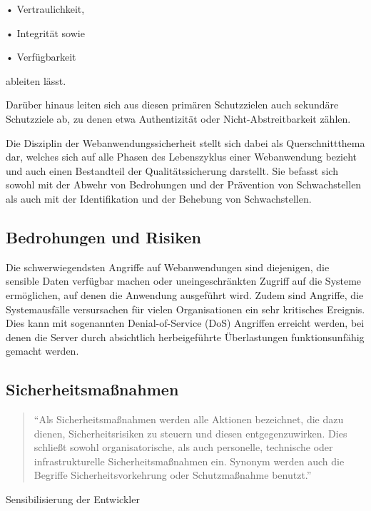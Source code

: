 \documentclass[12pt,oneside,a4paper,parskip]{scrbook}
\begin{document}
  • Vertraulichkeit,

  • Integrität sowie

  • Verfügbarkeit

  ableiten lässt.

  Darüber hinaus leiten sich aus diesen primären Schutzzielen auch sekundäre Schutzziele ab, zu denen etwa
  Authentizität oder Nicht-Abstreitbarkeit zählen.

  Die Disziplin der Webanwendungssicherheit stellt sich dabei als Querschnittthema dar, welches sich auf alle
  Phasen des Lebenszyklus einer Webanwendung bezieht und auch einen Bestandteil der Qualitätssicherung
  darstellt. Sie befasst sich sowohl mit der Abwehr von Bedrohungen und der Prävention von Schwachstellen
  als auch mit der Identifikation und der Behebung von Schwachstellen. \cite{BSI}
  \subsection{Bedrohungen und Risiken}
  Die schwerwiegendsten Angriffe auf Webanwendungen sind diejenigen, die sensible Daten verfügbar machen oder uneingeschränkten Zugriff auf die Systeme ermöglichen, auf denen die Anwendung ausgeführt wird. Zudem sind Angriffe, die Systemausfälle versursachen für vielen Organisationen ein sehr kritisches Ereignis. Dies kann mit sogenannten Denial-of-Service (DoS) Angriffen erreicht werden, bei denen die Server durch absichtlich herbeigeführte Überlastungen funktionsunfähig gemacht werden.


  \subsection{Sicherheitsmaßnahmen}
    \begin{quote} ``Als Sicherheitsmaßnahmen werden alle Aktionen bezeichnet, die dazu dienen, Sicherheitsrisiken zu steuern und diesen entgegenzuwirken. Dies schließt sowohl organisatorische, als auch personelle, technische oder infrastrukturelle Sicherheitsmaßnahmen ein. Synonym werden auch die Begriffe Sicherheitsvorkehrung oder Schutzmaßnahme benutzt.'' \cite{BSI2}\end{quote}

    Sensibilisierung der Entwickler
\end{document}
